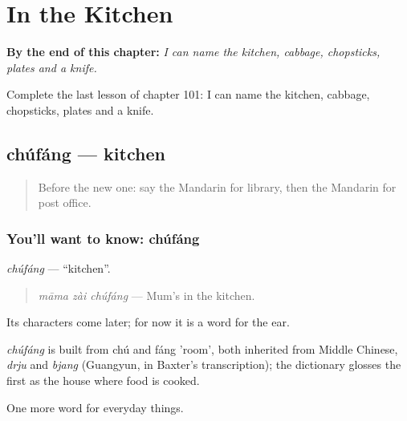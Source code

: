 
\chapter{In the Kitchen}
\label{ch:zh-in-the-kitchen}

\begin{chapteropening}
\textbf{By the end of this chapter:} \emph{I can name the kitchen, cabbage, chopsticks, plates and a knife.}

Complete the last lesson of chapter 101: I can name the kitchen, cabbage, chopsticks, plates and a knife.
\end{chapteropening}

\section[chúfáng]{chúfáng — kitchen}

\label{lesson:ZH-C101-chufang}



\begin{quote}
Before the new one: say the Mandarin for library, then the Mandarin for post office.
\end{quote}

\subsection*{You'll want to know: chúfáng}
\emph{chúfáng} — \textquotedblleft{}kitchen\textquotedblright{}.

\begin{quote}
\emph{māma zài chúfáng} — Mum's in the kitchen.
\end{quote}

Its characters come later; for now it is a word for the ear.

\begin{cousinweb}
\emph{chúfáng} is built from chú and fáng 'room', both inherited from Middle Chinese, \emph{drju} and \emph{bjang} (Guangyun, in Baxter's transcription); the dictionary glosses the first as the house where food is cooked.
\end{cousinweb}

\begin{grammarlens}[title={What you've built}]
One more word for everyday things.
\end{grammarlens}

